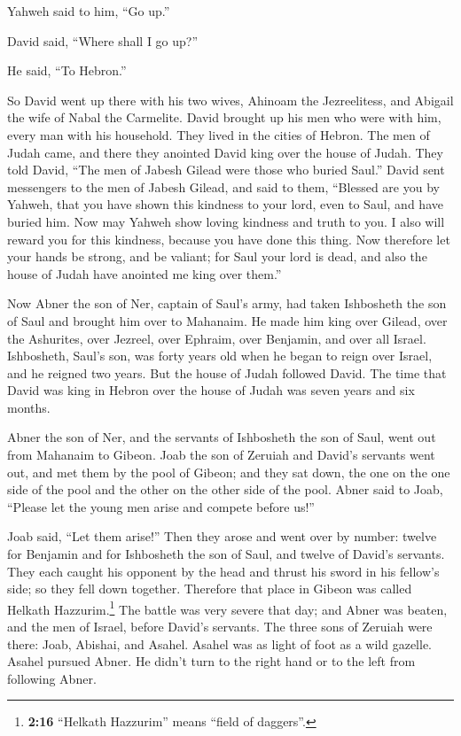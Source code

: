 Yahweh said to him, ``Go up.''

David said, ``Where shall I go up?''

He said, ``To Hebron.''

 So David went up there with his two wives, Ahinoam the
Jezreelitess, and Abigail the wife of Nabal the Carmelite.
 David brought up his men who were with him, every man
with his household. They lived in the cities of Hebron. 
The men of Judah came, and there they anointed David king over the house
of Judah. They told David, ``The men of Jabesh Gilead were those who
buried Saul.''  David sent messengers to the men of Jabesh
Gilead, and said to them, ``Blessed are you by Yahweh, that you have
shown this kindness to your lord, even to Saul, and have buried him.
 Now may Yahweh show loving kindness and truth to you. I
also will reward you for this kindness, because you have done this
thing.  Now therefore let your hands be strong, and be
valiant; for Saul your lord is dead, and also the house of Judah have
anointed me king over them.''

 Now Abner the son of Ner, captain of Saul's army, had
taken Ishbosheth the son of Saul and brought him over to Mahanaim.
 He made him king over Gilead, over the Ashurites, over
Jezreel, over Ephraim, over Benjamin, and over all Israel.
 Ishbosheth, Saul's son, was forty years old when he
began to reign over Israel, and he reigned two years. But the house of
Judah followed David.  The time that David was king in
Hebron over the house of Judah was seven years and six months.

 Abner the son of Ner, and the servants of Ishbosheth the
son of Saul, went out from Mahanaim to Gibeon.  Joab the
son of Zeruiah and David's servants went out, and met them by the pool
of Gibeon; and they sat down, the one on the one side of the pool and
the other on the other side of the pool.  Abner said to
Joab, ``Please let the young men arise and compete before us!''

Joab said, ``Let them arise!''  Then they arose and went
over by number: twelve for Benjamin and for Ishbosheth the son of Saul,
and twelve of David's servants.  They each caught his
opponent by the head and thrust his sword in his fellow's side; so they
fell down together. Therefore that place in Gibeon was called Helkath
Hazzurim.\footnote{\textbf{2:16} ``Helkath Hazzurim'' means ``field of
  daggers''.}  The battle was very severe that day; and
Abner was beaten, and the men of Israel, before David's servants.
 The three sons of Zeruiah were there: Joab, Abishai, and
Asahel. Asahel was as light of foot as a wild gazelle. 
Asahel pursued Abner. He didn't turn to the right hand or to the left
from following Abner.

